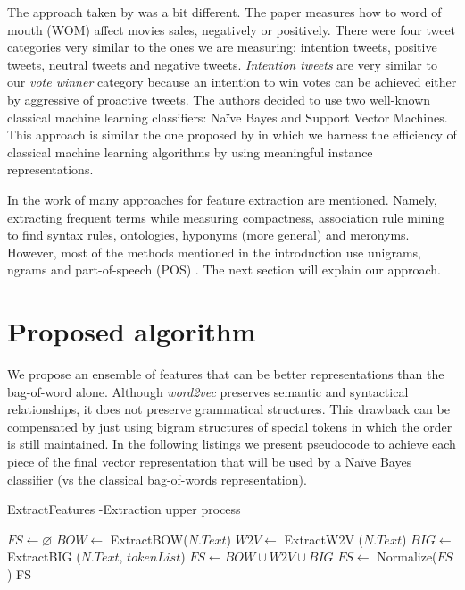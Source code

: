 \documentclass[author-year, review]{elsarticle} %
\let\parencite\cite
\begin{document}
The approach taken by
\parencite{42013}
was a bit different. The paper measures how to word of mouth (WOM)
affect movies sales, negatively or positively. There were four tweet
categories very similar to the ones we are measuring: intention tweets,
positive tweets, neutral tweets and negative tweets. \emph{Intention
tweets} are very similar to our \emph{vote winner} category because an
intention to win votes can be achieved either by aggressive of proactive
tweets. The authors decided to use two well-known classical machine
learning classifiers: Naïve Bayes and Support Vector Machines. This
approach is similar the one proposed by
\parencite{2002a}
in which we harness the efficiency of classical machine learning
algorithms by using meaningful instance representations.

In the work of
\parencite{12013}
many approaches for feature extraction are mentioned. Namely, extracting
frequent terms while measuring compactness, association rule mining to
find syntax rules, ontologies, hyponyms (more general) and meronyms.
However, most of the methods mentioned in the introduction use unigrams,
ngrams and part-of-speech (POS)
\parencite{12014}.
The next section will explain our approach.

\section{Proposed algorithm}\label{proposed-algorithm}

We propose an ensemble of features that can be better representations
than the bag-of-word alone. Although \emph{word2vec} preserves semantic
and syntactical relationships, it does not preserve grammatical
structures. This drawback can be compensated by just using bigram
structures of special tokens in which the order is still maintained. In
the following listings we present pseudocode to achieve each piece of
the final vector representation that will be used by a Naïve Bayes
classifier (vs the classical bag-of-words representation).

 \begin{algorithm}[H]
\caption{ExtractFeatures -Extraction upper process }\label{alg:minerpattern}
\begin{algorithmic}[1]
\State $ FS \gets \varnothing $
\State $ BOW \gets $ ExtractBOW($N.Text$) 
\State $ W2V \gets $ ExtractW2V ($N.Text$) 
\State $ BIG \gets $ ExtractBIG ($N.Text$, $tokenList $) 
\State $ FS \gets BOW \cup W2V \cup BIG $ 
\State $ FS \gets $ Normalize($FS$)
\State\Return FS
\EndProcedure
\end{algorithmic}
\end{algorithm}
\end{document}
